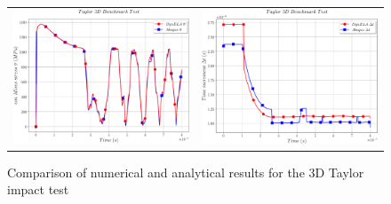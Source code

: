 \begin{figure}[h]
\begin{centering}
\begin{tabular}{cc}
\includegraphics[width=0.45\columnwidth]{Figures/Samples/Impact/Taylor-3D_vonMises} & \includegraphics[width=0.45\columnwidth]{Figures/Samples/Impact/Taylor-3D_timeStep}\tabularnewline
\end{tabular}
\par\end{centering}
\caption{Comparison of numerical and analytical results for the 3D Taylor impact
test\label{fig:Samples!Impact!Taylor3D-comparison}}
\end{figure}

